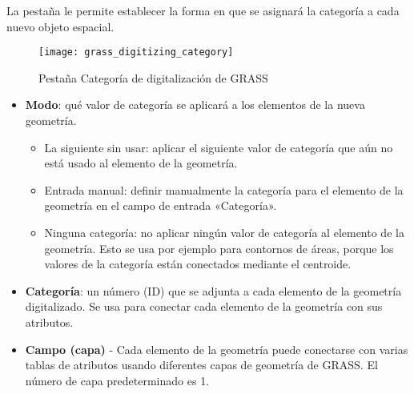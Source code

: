
La pestaña  le permite establecer la forma en que se asignará la categoría a cada nuevo objeto espacial.

\begin{figure}[h]
 \begin{center}
  \caption{Pestaña Categoría de digitalización de GRASS \nixcaption}\label{fig:grass_digitizing_category}
  \texttt{[image: grass\_digitizing\_category]}
 \end{center}
\end{figure}

\begin{itemize}
\item \textbf{Modo}: qué valor de categoría se aplicará a los elementos de la nueva geometría.
\begin{itemize}
\item La siguiente sin usar: aplicar el siguiente valor de categoría que aún no está usado al elemento de la geometría.
\item Entrada manual: definir manualmente la categoría para el elemento de la geometría en el campo de entrada «Categoría».
\item Ninguna categoría: no aplicar ningún valor de categoría al elemento de la geometría.
Esto se usa por ejemplo para contornos de áreas, porque los valores de la categoría están conectados mediante el centroide.
\end{itemize}
\item \textbf{Categoría}: un número (ID) que se adjunta a cada elemento de la geometría 
digitalizado. Se usa para conectar cada elemento de la geometría con sus atributos.
\item \textbf{Campo (capa)} - Cada elemento de la geometría puede conectarse con varias
tablas de atributos usando diferentes capas de geometría de GRASS. El número de capa predeterminado es 1. 
\end{itemize}

\begin{Tip}\caption{\textsc{Crear «capas» adicionales de GRASS con QGIS}}
\end{Tip}

\label{label_settingtab}

